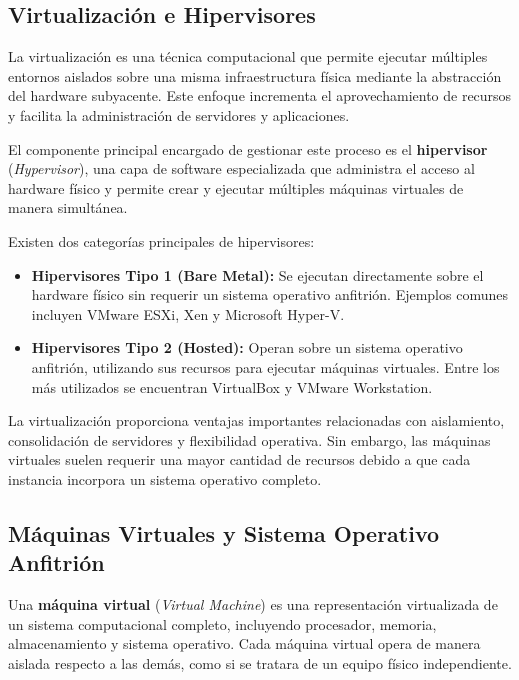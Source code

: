 \documentclass[12pt, oneside, letterpaper]{book}
\begin{document}
\subsection{Virtualización e Hipervisores}

La virtualización es una técnica computacional que permite ejecutar múltiples entornos aislados sobre una misma infraestructura física mediante la abstracción del hardware subyacente. Este enfoque incrementa el aprovechamiento de recursos y facilita la administración de servidores y aplicaciones.

El componente principal encargado de gestionar este proceso es el \textbf{hipervisor} (\textit{Hypervisor}), una capa de software especializada que administra el acceso al hardware físico y permite crear y ejecutar múltiples máquinas virtuales de manera simultánea.

Existen dos categorías principales de hipervisores:

\begin{itemize}
\item \textbf{Hipervisores Tipo 1 (Bare Metal):} Se ejecutan directamente sobre el hardware físico sin requerir un sistema operativo anfitrión. Ejemplos comunes incluyen VMware ESXi, Xen y Microsoft Hyper-V.

\item \textbf{Hipervisores Tipo 2 (Hosted):} Operan sobre un sistema operativo anfitrión, utilizando sus recursos para ejecutar máquinas virtuales. Entre los más utilizados se encuentran VirtualBox y VMware Workstation.
\end{itemize}

La virtualización proporciona ventajas importantes relacionadas con aislamiento, consolidación de servidores y flexibilidad operativa. Sin embargo, las máquinas virtuales suelen requerir una mayor cantidad de recursos debido a que cada instancia incorpora un sistema operativo completo.

\subsection{Máquinas Virtuales y Sistema Operativo Anfitrión}

Una \textbf{máquina virtual} (\textit{Virtual Machine}) es una representación virtualizada de un sistema computacional completo, incluyendo procesador, memoria, almacenamiento y sistema operativo. Cada máquina virtual opera de manera aislada respecto a las demás, como si se tratara de un equipo físico independiente.
\end{document}
